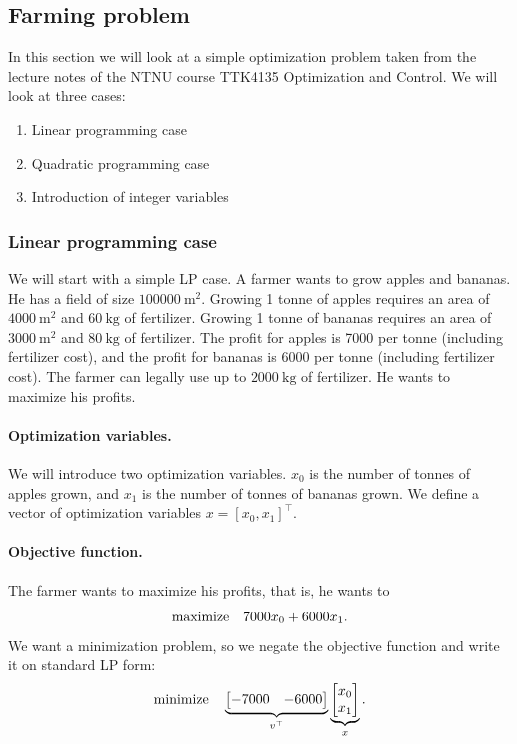 \newpage
\subsection{Farming problem}
In this section we will look at a simple optimization problem taken from the lecture notes of the NTNU course TTK4135 Optimization and Control. We will look at three cases:
\begin{enumerate}
\item Linear programming case
\item Quadratic programming case
\item Introduction of integer variables
\end{enumerate}

\subsubsection{Linear programming case} \label{sec:farminglp}
We will start with a simple LP case. A farmer wants to grow apples and bananas. He has a field of size $100000\ \mathrm{m}^2$. Growing 1 tonne of apples requires an area of $4000\ \mathrm{m}^2$ and $60\ \mathrm{kg}$ of fertilizer. Growing 1 tonne of bananas requires an area of $3000\ \mathrm{m}^2$ and $80\ \mathrm{kg}$ of fertilizer. The profit for apples is 7000 per tonne (including fertilizer cost), and the profit for bananas is 6000 per tonne (including fertilizer cost). The farmer can legally use up to $2000\ \mathrm{kg}$ of fertilizer. He wants to maximize his profits.

\paragraph{Optimization variables.} We will introduce two optimization variables. $x_0$ is the number of tonnes of apples grown, and $x_1$ is the number of tonnes of bananas grown. We define a vector of optimization variables $x = [x_0, x_1]^\top$.

\paragraph{Objective function.} The farmer wants to maximize his profits, that is, he wants to
\[
\mathrm{maximize} \ \ \  7000x_0 + 6000x_1.
\]
We want a minimization problem, so we negate the objective function and write it on standard LP form:
\[
\mathrm{minimize} \ \ \  \underbrace{\begin{bmatrix} -7000 & -6000 \end{bmatrix}}_{v^\top} \underbrace{\begin{bmatrix} x_0 \\ x_1 \end{bmatrix}}_x.
\]

